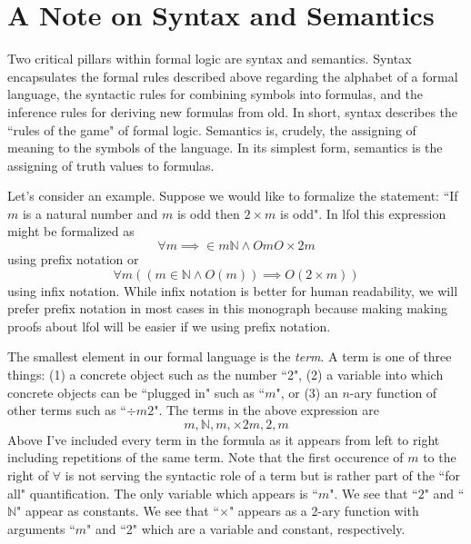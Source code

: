 \documentclass[oneside, 12pt]{book}
\theoremstyle{break}
\newtheorem{preformal definition}[definition]{Preformal Definition}
\newtheorem{preformal theorem}[theorem]{Preformal Theorem}
\newcommand{\qq}[1]{``#1"}
\newcommand{\N}[0]{\mathbb{N}}
\begin{document}
		\section{A Note on Syntax and Semantics}
			
			Two critical pillars within formal logic are syntax and semantics.
			Syntax encapsulates the formal rules described above regarding the alphabet of a formal language, the syntactic rules for combining symbols into formulas, and the inference rules for deriving new formulas from old.
			In short, syntax describes the \qq{rules of the game} of formal logic.
			Semantics is, crudely, the assigning of meaning to the symbols of the language.
			In its simplest form, semantics is the assigning of truth values to formulas.
			
			Let's consider an example.
			Suppose we would like to formalize the statement: \qq{If $m$ is a natural number and $m$ is odd then $2\times m$ is odd}.
			In \gls{lfol} this expression might be formalized as
			\begin{equation*}
				\forall m\implies \in m \mathbb{N} \land Om O\times 2 m
			\end{equation*}
			using prefix notation or
			\begin{equation*}
				\forall m ( (m \in \N \land O(m)) \implies O(2\times m))
			\end{equation*}
			using infix notation.
			While infix notation is better for human readability, we will prefer prefix notation in most cases in this monograph because making making proofs about \gls{lfol} will be easier if we using prefix notation.
			
			The smallest element in our formal language is the \textit{term}.
			A term is one of three things: (1) a concrete object such as the number \qq{2}, (2) a variable into which concrete objects can be \qq{plugged in} such as \qq{$m$}, or (3) an $n$-ary function of other terms such as \qq{$\div m 2$}.
			The terms in the above expression are
			\begin{equation*}
				m, \N, m, \times 2 m, 2, m
			\end{equation*}
			Above I've included every term in the formula as it appears from left to right including repetitions of the same term.
			Note that the first occurence of $m$ to the right of $\forall$ is not serving the syntactic role of a term but is rather part of the \qq{for all} quantification.
			The only variable which appears is \qq{$m$}.
			We see that \qq{$2$} and \qq{$\mathbb{N}$} appear as constants.
			We see that \qq{$\times$} appears as a 2-ary function with arguments \qq{$m$} and \qq{2} which are a variable and constant, respectively.
			
\end{document}
